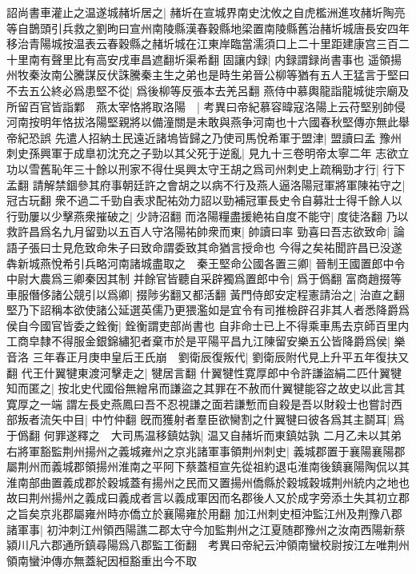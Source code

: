 詔尚書車灌止之温遂城赭圻居之|{
	赭圻在宣城界南史沈攸之自虎檻洲進攻赭圻陶亮等自鵲頭引兵救之劉昫曰宣州南陵縣漢春穀縣地梁置南陵縣舊治赭圻城唐長安四年移治青陽城按温表云春穀縣之赭圻城在江東岸臨當濡須口上二十里距建康宫三百二十里南有聲里比有高安戌車昌遮翻圻渠希翻}
固讓内録|{
	内録謂録尚書事也}
遥領揚州牧秦汝南公騰謀反伏誅騰秦主生之弟也是時生弟晉公柳等猶有五人王猛言于堅曰不去五公終必爲患堅不從|{
	爲後柳等反張本去羌呂翻}
燕侍中慕輿龍詣龍城徙宗廟及所留百官皆詣鄴　燕太宰恪將取洛陽　|{
	考異曰帝紀慕容暐寇洛陽上云苻堅别帥侵河南按明年恪拔洛陽堅親將以備潼關是未敢與燕争河南也十六國春秋堅傳亦無此舉帝紀恐誤}
先遣人招納土民遠近諸塢皆歸之乃使司馬悅希軍于盟津|{
	盟讀曰孟}
豫州刺史孫興軍于成臯初沈充之子勁以其父死于逆亂|{
	見九十三卷明帝太寧二年}
志欲立功以雪舊恥年三十餘以刑家不得仕吳興太守王胡之爲司州刺史上疏稱勁才行|{
	行下孟翻}
請解禁錮參其府事朝廷許之會胡之以病不行及燕人逼洛陽冠軍將軍陳祐守之|{
	冠古玩翻}
衆不過二千勁自表求配祐効力詔以勁補冠軍長史令自募壯士得千餘人以行勁屢以少擊燕衆摧破之|{
	少詩沼翻}
而洛陽糧盡援絶祐自度不能守|{
	度徒洛翻}
乃以救許昌爲名九月留勁以五百人守洛陽祐帥衆而東|{
	帥讀曰率}
勁喜曰吾志欲致命|{
	論語子張曰士見危致命朱子曰致命謂委致其命猶言授命也}
今得之矣祐聞許昌已没遂犇新城燕悅希引兵略河南諸城盡取之　秦王堅命公國各置三卿|{
	晉制王國置郎中令中尉大農爲三卿秦因其制}
并餘官皆聽自采辟獨爲置郎中令|{
	爲于僞翻}
富商趙掇等車服僭侈諸公競引以爲卿|{
	掇陟劣翻又都活翻}
黃門侍郎安定程憲請治之|{
	治直之翻}
堅乃下詔稱本欲使諸公延選英儒乃更猥濫如是宜令有司推檢辟召非其人者悉降爵爲侯自今國官皆委之銓衡|{
	銓衡謂吏部尚書也}
自非命士已上不得乘車馬去京師百里内工商皁隸不得服金銀錦繡犯者棄市於是平陽平昌九江陳留安樂五公皆降爵爲侯|{
	樂音洛}
三年春正月庚申皇后王氏崩　劉衛辰復叛代|{
	劉衛辰附代見上升平五年復扶又翻}
代王什翼犍東渡河擊走之|{
	犍居言翻}
什翼犍性寛厚郎中令許謙盜絹二匹什翼犍知而匿之|{
	按北史代國俗無繒帛而謙盜之其罪在不赦而什翼犍能容之故史以此言其寛厚之一端}
謂左長史燕鳳曰吾不忍視謙之面若謙慙而自殺是吾以財殺士也嘗討西部叛者流矢中目|{
	中竹仲翻}
旣而獲射者羣臣欲臠割之什翼犍曰彼各爲其主鬬耳|{
	爲于僞翻}
何罪遂釋之　大司馬温移鎮姑孰|{
	温又自赭圻而東鎮姑孰}
二月乙未以其弟右將軍豁監荆州揚州之義城雍州之京兆諸軍事領荆州刺史|{
	義城郡置于襄陽襄陽郡屬荆州而義城郡領揚州淮南之平阿下蔡蓋桓宣先從祖約退屯淮南後鎮襄陽陶侃以其淮南部曲置義成郡於穀城蓋有揚州之民而又置揚州僑縣於穀城穀城荆州統内之地也故曰荆州揚州之義成曰義成者言以義成軍因而名郡後人又於成字旁添土失其初立郡之旨矣京兆郡屬雍州時亦僑立於襄陽雍於用翻}
加江州刺史桓沖監江州及荆豫八郡諸軍事|{
	初沖刺江州領西陽譙二郡太守今加監荆州之江夏随郡豫州之汝南西陽新蔡潁川凡六郡通所鎮尋陽爲八郡監工銜翻　考異曰帝紀云沖領南蠻校尉按江左唯荆州領南蠻沖傳亦無蓋紀因桓豁重出今不取}
